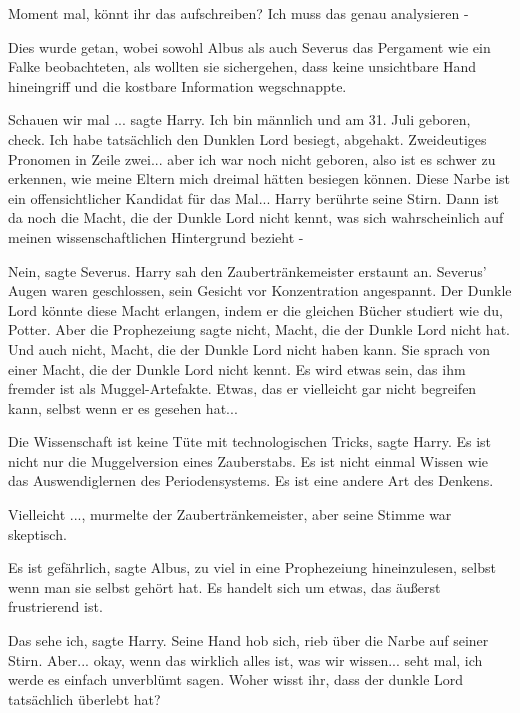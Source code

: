 \glqq{}Moment mal, könnt ihr das aufschreiben? Ich muss das genau analysieren
-\grqq{}

Dies wurde getan, wobei sowohl Albus als auch Severus das Pergament wie ein
Falke beobachteten, als wollten sie sichergehen, dass keine unsichtbare Hand
hineingriff und die kostbare Information wegschnappte.

\glqq{}Schauen wir mal ...\grqq{} sagte Harry. \glqq{}Ich bin männlich und am 31.
Juli geboren, check. Ich habe tatsächlich den Dunklen Lord besiegt, abgehakt.
Zweideutiges Pronomen in Zeile zwei... aber ich war noch nicht geboren, also ist
es schwer zu erkennen, wie meine Eltern mich dreimal hätten besiegen können.
Diese Narbe ist ein offensichtlicher Kandidat für das Mal...\grqq{} Harry
berührte seine Stirn. \glqq{}Dann ist da noch die Macht, die der Dunkle Lord
nicht kennt, was sich wahrscheinlich auf meinen wissenschaftlichen Hintergrund
bezieht -\grqq{}

\glqq{}Nein\grqq{}, sagte Severus. Harry sah den Zaubertränkemeister erstaunt an.
Severus' Augen waren geschlossen, sein Gesicht vor Konzentration angespannt.
\glqq{}Der Dunkle Lord könnte diese Macht erlangen, indem er die gleichen Bücher
studiert wie du, Potter. Aber die Prophezeiung sagte nicht, Macht, die der
Dunkle Lord nicht hat. Und auch nicht, Macht, die der Dunkle Lord nicht haben
kann. Sie sprach von einer Macht, die der Dunkle Lord nicht kennt. Es wird etwas
sein, das ihm fremder ist als Muggel-Artefakte. Etwas, das er vielleicht gar
nicht begreifen kann, selbst wenn er es gesehen hat...\grqq{}

\glqq{}Die Wissenschaft ist keine Tüte mit technologischen Tricks\grqq{}, sagte
Harry. \glqq{}Es ist nicht nur die Muggelversion eines Zauberstabs. Es ist nicht
einmal Wissen wie das Auswendiglernen des Periodensystems. Es ist eine andere
Art des Denkens.\grqq{}

\glqq{}Vielleicht ...\grqq{}, murmelte der Zaubertränkemeister, aber seine Stimme
war skeptisch.

\glqq{}Es ist gefährlich\grqq{}, sagte Albus, \glqq{}zu viel in eine Prophezeiung
hineinzulesen, selbst wenn man sie selbst gehört hat. Es handelt sich um etwas,
das äußerst frustrierend ist.\grqq{}

\glqq{}Das sehe ich\grqq{}, sagte Harry. Seine Hand hob sich, rieb über die Narbe
auf seiner Stirn. \glqq{}Aber... okay, wenn das wirklich alles ist, was wir
wissen... seht mal, ich werde es einfach unverblümt sagen. Woher wisst ihr, dass
der dunkle Lord tatsächlich überlebt hat?\grqq{}

